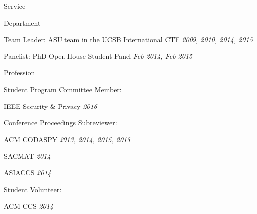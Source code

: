 \begin{rSection}{Service}

  \begin{rBulletSubsection}{Department}

    \item Team Leader: ASU team in the UCSB International CTF \hfill \emph{2009, 2010, 2014, 2015}

    \item Panelist: PhD Open House Student Panel \hfill \emph{Feb 2014, Feb 2015}

  \end{rBulletSubsection}

  \begin{rBulletSubsection}{Profession}

    \item Student Program Committee Member:
      \begin{rBulletList}

        \item IEEE Security \& Privacy \hfill \emph{2016}

      \end{rBulletList}

    \item Conference Proceedings Subreviewer:
      \begin{rBulletList}

        \item ACM CODASPY \hfill \emph{2013, 2014, 2015, 2016}

        \item SACMAT \hfill \emph{2014}

        \item ASIACCS \hfill \emph{2014}

      \end{rBulletList}

    \item Student Volunteer:
      \begin{rBulletList}

        \item ACM CCS \hfill \emph{2014}

      \end{rBulletList}

  \end{rBulletSubsection}


\end{rSection}
